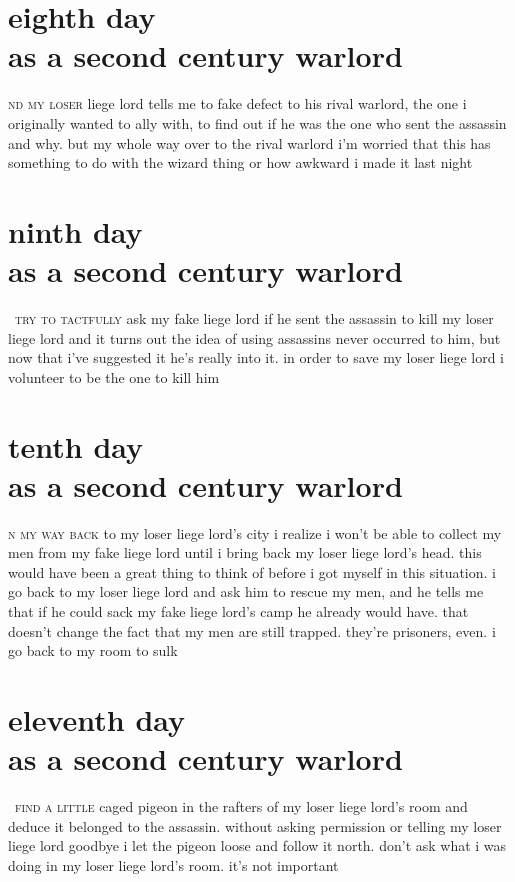\documentclass[smalldemyvopaper,11pt,twoside,onecolumn,openany,extrafontsizes]{memoir}
\newlength\drop
\begin{document}
\chapter{eighth day\\as a second century warlord}

\lettrine[lhang=0.2,lines=3,findent=0pt]{}{nd my loser} liege lord
tells me to fake defect to his rival warlord, the one i originally wanted to
ally with, to find out if he was the one who sent the assassin and why.
but my whole way over to the rival warlord i'm worried that this has something
to do with the wizard thing or how awkward i made it last night 

\chapter{ninth day\\as a second century warlord}

\lettrine[lhang=0.2,lines=3,findent=2pt]{}{\, try to tactfully}
ask my fake liege lord if he sent the assassin to kill my loser liege lord and
it turns out the idea of using assassins never occurred to him, but now that
i've suggested it he's really into it. in order to save my loser liege lord i
volunteer to be the one to kill him

\chapter{tenth day\\as a second century warlord}

\lettrine[lhang=0.2,lines=3,findent=2pt]{}{n my way back} to my
loser liege lord's city i realize i won't be able to collect my men from my
fake liege lord until i bring back my loser liege lord's head. this would have
been a great thing to think of before i got myself in this situation. i go back
to my loser liege lord and ask him to rescue my men, and he tells me that if he
could sack my fake liege lord's camp he already would have. that doesn't change
the fact that my men are still trapped. they're prisoners, even. i go back to
my room to sulk

\chapter{eleventh day\\as a second century warlord}

\lettrine[lhang=0.2,lines=3,findent=2pt]{}{\, find a little}
caged pigeon in the rafters of my loser liege lord's room and deduce it
belonged to the assassin. without asking permission or telling my loser liege
lord goodbye i let the pigeon loose and follow it north. don't ask what i was
doing in my loser liege lord's room. it's not important
\end{document}
